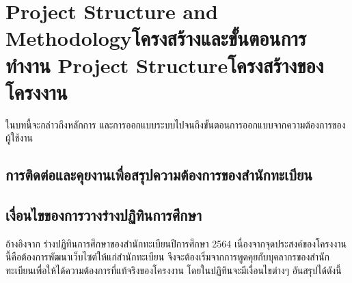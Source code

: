 \chapter{\ifproject%
\ifenglish Project Structure and Methodology\else โครงสร้างและขั้นตอนการทำงาน\fi
\else%
\ifenglish Project Structure\else โครงสร้างของโครงงาน\fi
\fi
}

ในบทนี้จะกล่าวถึงหลักการ และการออกแบบระบบไปจนถึงขั้นตอนการออกแบบจากความต้องการของผู้ใช้งาน

\makeatletter


\makeatother

\section{การติดต่อและคุยงานเพื่อสรุปความต้องการของสำนักทะเบียน}


\section{เงื่อนไขของการวางร่างปฏิทินการศึกษา}
  อ้างอิงจาก ร่างปฏิทินการศึกษาของสำนักทะเบียนปีการศึกษา 2564{\cite{CMU_Calendar}}
  เนื่องจากจุดประสงค์ของโครงงานนี้คือต้องการพัฒนาเว็บไซต์ให้แก่สำนักทะเบียน
จึงจะต้องเริ่มจากการพูดคุยกับบุคลากรของสำนักทะเบียนเพื่อให้ได้ความต้องการที่แท้จริงของโครงงาน โดยในปฏิทินจะมีเงื่อนไขต่างๆ อันสรุปได้ดังนี้


